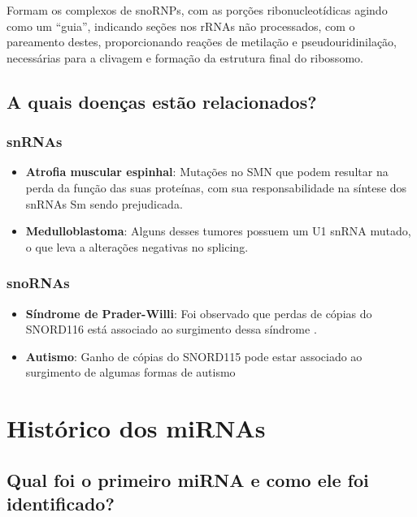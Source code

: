 \documentclass[
]{book}
\begin{document}
Formam os complexos de snoRNPs, com as porções ribonucleotídicas agindo como um ``guia'', indicando seções nos rRNAs não processados, com o pareamento destes, proporcionando reações de metilação e pseudouridinilação, necessárias para a clivagem e formação da estrutura final do ribossomo.

\hypertarget{a-quais-doenuxe7as-estuxe3o-relacionados}{%
\section{A quais doenças estão relacionados?}\label{a-quais-doenuxe7as-estuxe3o-relacionados}}

\hypertarget{snrnas-2}{%
\subsection{snRNAs}\label{snrnas-2}}

\begin{itemize}
\item
  \textbf{Atrofia muscular espinhal}: Mutações no SMN que podem resultar na perda da função das suas proteínas, com sua responsabilidade na síntese dos snRNAs Sm sendo prejudicada.
\item
  \textbf{Medulloblastoma}: Alguns desses tumores possuem um U1 snRNA mutado, o que leva a alterações negativas no splicing.
\end{itemize}

\hypertarget{snornas-2}{%
\subsection{snoRNAs}\label{snornas-2}}

\begin{itemize}
\item
  \textbf{Síndrome de Prader-Willi}: Foi observado que perdas de cópias do SNORD116 está associado ao surgimento dessa síndrome \citep{Sahoo_2008}.
\item
  \textbf{Autismo}: Ganho de cópias do SNORD115 pode estar associado ao surgimento de algumas formas de autismo \citep{Bolton_2004}
\end{itemize}

\hypertarget{histuxf3rico-dos-mirnas}{%
\chapter{Histórico dos miRNAs}\label{histuxf3rico-dos-mirnas}}

\hypertarget{qual-foi-o-primeiro-mirna-e-como-ele-foi-identificado}{%
\section{Qual foi o primeiro miRNA e como ele foi identificado?}\label{qual-foi-o-primeiro-mirna-e-como-ele-foi-identificado}}
\end{document}
